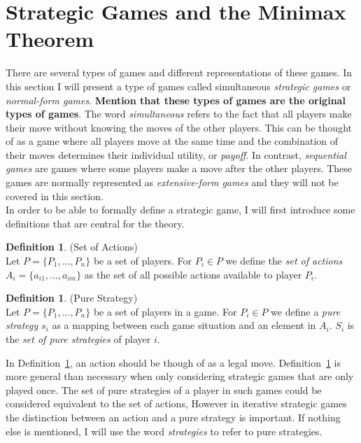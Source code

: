 \documentclass{article}
\theoremstyle{definition}
\newtheorem{definition}[theorem]{Definition}
\theoremstyle{remark}
\begin{document}
\section{Strategic Games and the Minimax Theorem}\label{Strategic Games}
There are several types of games and different representations of
these games. In this section I will present a type of games called
simultaneous \emph{strategic games} or \emph{normal-form
  games}. \textbf{Mention that these types of games are the original
  types of games}. The word \emph{simultaneous} refers to the fact that all
players make their move without knowing the moves of the other
players. This can be thought of as a game where all players move at
the same time and the combination of their moves determines their
individual utility, or \emph{payoff}. In contrast, \emph{sequential
  games} are games where some players make a move after the other
players. These games are normally represented as \emph{extensive-form
  games} and they will not be covered in this section. \\

In order to be able to formally define a strategic game, I
will first introduce some definitions that are central for the
theory.

\begin{definition} (Set of Actions) \label{Set of actions}\\
  Let $P = \{P_1,...,P_n\}$ be a set of players. For $P_i
  \in P$ we define the \emph{set of actions} $A_i =
  \{a_{i1},...,a_{im}\}$ as the set of all possible actions available
  to player $P_i$. 
  \end{definition}

\begin{definition} (Pure Strategy) \label{Strategy}\\
  Let $P = \{P_1,...,P_n\}$ be a set of players in a game. For $P_i
  \in P$ we define a \emph{pure strategy} $s_i$ as a mapping between each
  game situation and an element in $A_i$. $S_i$ is the \emph{set of
    pure strategies} of player $i$.
\end{definition}

In Definition~\ref{Set of actions}, an action should be though of as a
legal move. Definition~\ref{Strategy} is more general than necessary
when only considering strategic games that are only played once. The
set of pure strategies of a player in such games could be considered
equivalent to the set of actions, However in iterative strategic games
the distinction between an action and a pure strategy is
important. If nothing else is mentioned, I will use the word
\emph{strategies} to refer to pure strategies.   
\end{document}
